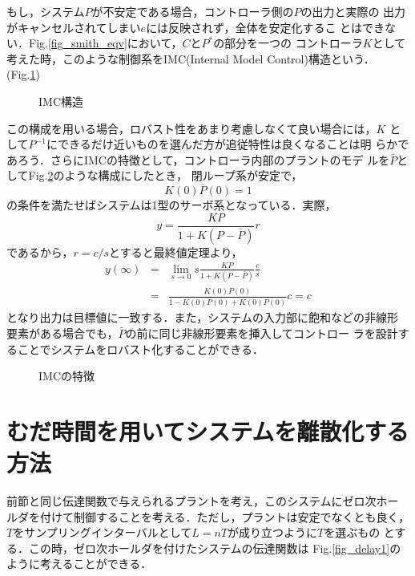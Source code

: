 もし，システム$P$が不安定である場合，コントローラ側の$P$の出力と実際の
出力がキャンセルされてしまい$e$には反映されず，全体を安定化するこ
とはできない．Fig.\ref{fig_smith_eqv}において，$C$と$P^*$の部分を一つの
コントローラ$K$として
考えた時，このような制御系をIMC(Internal Model Control)構造という．
(Fig.\ref{fig_imc})
\begin{figure}[htbp]
 \begin{center}
  \caption{IMC構造}
  \label{fig_imc}
 \end{center}
\end{figure}

この構成を用いる場合，ロバスト性をあまり考慮しなくて良い場合には，$K$
として$P^{-1}$にできるだけ近いものを選んだ方が追従特性は良くなることは明
らかであろう．さらにIMCの特徴として，コントローラ内部のプラントのモデ
ルを$\bar{P}$としてFig.\ref{fig_imc_cha}のような構成にしたとき，
閉ループ系が安定で，
\begin{equation}
 K(0)\bar{P}(0) = 1
\end{equation}
の条件を満たせばシステムは1型のサーボ系となっている．実際，
\begin{equation}
 y = \frac{KP}{1 + K(P - \bar{P})} r
\end{equation}
であるから，$r = c/s$とすると最終値定理より，
\begin{eqnarray}
 y(\infty) &=& \lim_{s \rightarrow 0}s 
  \frac{KP}{1 + K(P - \bar{P})}\frac{c}{s} \nonumber \\
 &=& \frac{K(0)P(0)}{1 - K(0)\bar{P}(0) + K(0)P(0)}c = c
\end{eqnarray}
となり出力は目標値に一致する．また，システムの入力部に飽和などの非線形
要素がある場合でも，$\bar{P}$の前に同じ非線形要素を挿入してコントロー
ラを設計することでシステムをロバスト化することができる．
\begin{figure}[htbp]
 \begin{center}
  \caption{IMCの特徴}
  \label{fig_imc_cha}
 \end{center}
\end{figure}
\section{むだ時間を用いてシステムを離散化する方法}
前節と同じ伝達関数で与えられるプラントを考え，このシステムにゼロ次ホー
ルダを付けて制御することを考える．ただし，プラントは安定でなくとも良く，
$T$をサンプリングインターバルとして$L = nT$が成り立つように$T$を選ぶもの
とする．この時，ゼロ次ホールダを付けたシステムの伝達関数は
Fig.\ref{fig_delay1}のように考えることができる．

